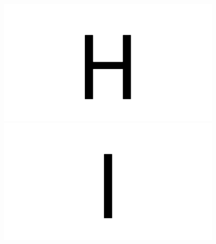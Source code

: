 \documentclass{article}
\begin{document}
\begin{figure}[H]
  \includegraphics[width=\linewidth]{u_H}
\endminipage\hfill
{}
  \includegraphics[width=\linewidth]{u_I}
\endminipage\hfill
\end{figure}
\end{document}
